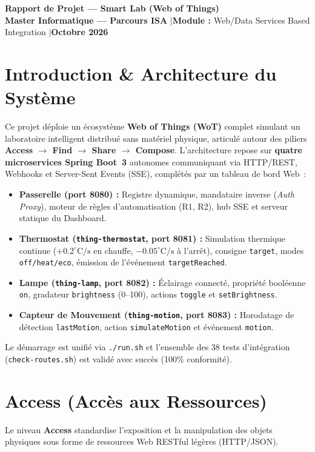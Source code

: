 \documentclass[10pt,a4paper]{article}
\begin{document}
\begin{center}
  {\LARGE\bfseries\color{primary} Rapport de Projet — Smart Lab (Web of Things)}\\[3pt]
  {\small\textbf{Master Informatique — Parcours ISA} \quad$\vert$\quad \textbf{Module :} Web/Data Services Based Integration \quad$\vert$\quad \textbf{Octobre 2026}}
\end{center}
\vspace{-6pt}

\section*{Introduction \& Architecture du Système}
Ce projet déploie un écosystème \textbf{Web of Things (WoT)} complet simulant un laboratoire intelligent distribué sans matériel physique, articulé autour des piliers \textbf{Access $\rightarrow$ Find $\rightarrow$ Share $\rightarrow$ Compose}. L'architecture repose sur \textbf{quatre microservices Spring Boot~3} autonomes communiquant via HTTP/REST, Webhooks et Server-Sent Events (SSE), complétés par un tableau de bord Web~:
\begin{itemize}
  \item \textbf{Passerelle (port 8080) :} Registre dynamique, mandataire inverse (\emph{Auth Proxy}), moteur de règles d'automatisation (R1, R2), hub SSE et serveur statique du Dashboard.
  \item \textbf{Thermostat (\texttt{thing-thermostat}, port 8081) :} Simulation thermique continue ($+0.2^\circ\text{C/s}$ en chauffe, $-0.05^\circ\text{C/s}$ à l'arrêt), consigne \texttt{target}, modes \texttt{off/heat/eco}, émission de l'événement \texttt{targetReached}.
  \item \textbf{Lampe (\texttt{thing-lamp}, port 8082) :} Éclairage connecté, propriété booléenne \texttt{on}, gradateur \texttt{brightness} (0--100), actions \texttt{toggle} et \texttt{setBrightness}.
  \item \textbf{Capteur de Mouvement (\texttt{thing-motion}, port 8083) :} Horodatage de détection \texttt{lastMotion}, action \texttt{simulateMotion} et événement \texttt{motion}.
\end{itemize}
Le démarrage est unifié via \texttt{./run.sh} et l'ensemble des 38 tests d'intégration (\texttt{check-routes.sh}) est validé avec succès (100\% conformité).

\section{Access (Accès aux Ressources)}
Le niveau \textbf{Access} standardise l'exposition et la manipulation des objets physiques sous forme de ressources Web RESTful légères (HTTP/JSON).
\end{document}
